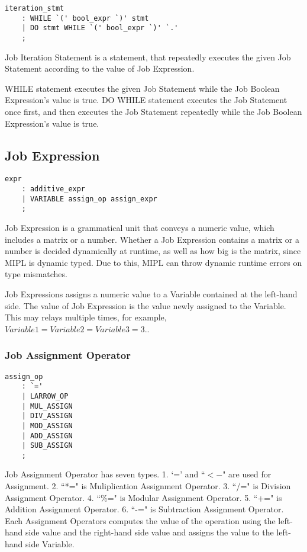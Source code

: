 \documentclass[prodmode,acmtecs]{acmsmall}
\begin{document}
\begin{lstlisting}
iteration_stmt
	: WHILE `(' bool_expr `)' stmt
	| DO stmt WHILE `(' bool_expr `)' `.'
	;
\end{lstlisting}

Job Iteration Statement is a statement, that repeatedly executes
the given Job Statement according to the value of Job Expression.

WHILE statement executes the given Job Statement while the Job
Boolean Expression's value is true.  DO WHILE statement executes the
Job Statement once first, and then executes the Job Statement repeatedly
while the Job Boolean Expression's value is true.
\medskip


\subsection{Job Expression}

\begin{lstlisting}
expr
	: additive_expr
	| VARIABLE assign_op assign_expr
	;
\end{lstlisting}

\label{Expression_Section}
Job Expression is a grammatical unit that conveys a numeric value,
which includes a matrix or a number.  Whether a Job Expression
contains a matrix or a number is decided dynamically at runtime,
as well as how big is the matrix, since MIPL is dynamic typed. Due
to this, MIPL can throw dynamic runtime errors on type mismatches.

Job Expressions assigns a numeric value to a Variable contained
at the left-hand side.  The value of Job Expression is the value
newly assigned to the Variable.  This may relays multiple times,
for example, $Variable1 = Variable2 = Variable3 = 3.$.
\medskip


\subsubsection{Job Assignment Operator}

\begin{lstlisting}
assign_op
	: `='
	| LARROW_OP
	| MUL_ASSIGN
	| DIV_ASSIGN
	| MOD_ASSIGN
	| ADD_ASSIGN
	| SUB_ASSIGN
	;
\end{lstlisting}

Job Assignment Operator has seven types.  1. `=' and ``$<-$" are used
for Assignment.  2. ``*=" is Muliplication Assignment Operator.  3. 
``/=" is Division Assignment Operator.  4. ``\%=" is Modular Assignment
Operator.  5. ``+=" is Addition Assignment Operator.  6. ``-=" is
Subtraction Assignment Operator.  Each Assignment Operators computes
the value of the operation using the left-hand side value and the
right-hand side value and assigns the value to the left-hand side
Variable.
\medskip
\end{document}
